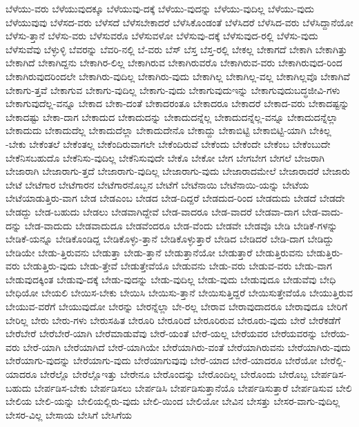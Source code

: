 {ಬೆಳೆಯು-ವರು
ಬೆಳೆಯುವುದಕ್ಕೂ
ಬೆಳೆಯುವು-ದಕ್ಕೆ
ಬೆಳೆಯು-ವುದನ್ನು
ಬೆಳೆಯು-ವುದಿಲ್ಲ
ಬೆಳೆಯು-ವುದು
ಬೆಳೆಯುವುವು
ಬೆಳೆಸದ-ವರು
ಬೆಳೆಸದೆ
ಬೆಳೆಸಬೇಕಾದರೆ
ಬೆಳೆಸಿಕೊಂಡಂತೆ
ಬೆಳೆಸಿದರೆ
ಬೆಳೆಸಿದ-ವರು
ಬೆಳೆಸಿದ್ದಾನೆಯೋ
ಬೆಳೆಸು-ತ್ತಾನೆ
ಬೆಳೆಸು-ವರು
ಬೆಳೆಸುವರೊ
ಬೆಳೆಸುವಳೋ
ಬೆಳೆಸುವು-ದಕ್ಕೆ
ಬೆಳೆಸುವುದ-ರಲ್ಲಿ
ಬೆಳೆಸು-ವುದು
ಬೆಳೆಸುವೆವು
ಬೆಳ್ಳುಳ್ಳಿ
ಬೆವರನ್ನು
ಬೆವರಿ-ನಲ್ಲಿ
ಬೆ-ವರು
ಬೆಸ್
ಬೆಸ್ತ
ಬೆಸ್ತ-ರಲ್ಲಿ
ಬೇಕಲ್ಲ
ಬೇಕಾಗದೆ
ಬೇಕಾಗಿ
ಬೇಕಾಗಿತ್ತು
ಬೇಕಾಗಿದೆ
ಬೇಕಾಗಿದ್ದನು
ಬೇಕಾಗಿರ-ಲಿಲ್ಲ
ಬೇಕಾಗಿರುವ
ಬೇಕಾಗಿರುವರೊ
ಬೇಕಾಗಿರುವ-ವರು
ಬೇಕಾಗಿರುವುದ-ರಿಂದ
ಬೇಕಾಗಿರುವುದರಿಂದಲೇ
ಬೇಕಾಗಿರು-ವುದಿಲ್ಲ
ಬೇಕಾಗಿರು-ವುದು
ಬೇಕಾಗಿಲ್ಲ
ಬೇಕಾಗಿಲ್ಲ-ವಲ್ಲ
ಬೇಕಾಗಿಲ್ಲವೊ
ಬೇಕಾಗಿವೆ
ಬೇಕಾಗು-ತ್ತವೆ
ಬೇಕಾಗುವ
ಬೇಕಾಗು-ವುದಿಲ್ಲ
ಬೇಕಾಗು-ವುದು
ಬೇಕಾಗುವುದುಇನ್ನು
ಬೇಕಾಗುವುದುಬದ್ಧಜೀವಿ-ಗಳು
ಬೇಕಾಗುವುದೆಲ್ಲ-ವನ್ನೂ
ಬೇಕಾದ
ಬೇಕಾ-ದಂತೆ
ಬೇಕಾದರಂತೂ
ಬೇಕಾದರೂ
ಬೇಕಾದರೆ
ಬೇಕಾದ-ವರು
ಬೇಕಾದಷ್ಟನ್ನು
ಬೇಕಾದಷ್ಟು
ಬೇಕಾ-ದಾಗ
ಬೇಕಾದುದ
ಬೇಕಾದುದನ್ನು
ಬೇಕಾದುದನ್ನೆಲ್ಲ
ಬೇಕಾದುದನ್ನೆಲ್ಲ-ವನ್ನೂ
ಬೇಕಾದುದನ್ನೆಲ್ಲಾ
ಬೇಕಾದುದು
ಬೇಕಾದುದೆಲ್ಲ
ಬೇಕಾದುದೆಲ್ಲಾ
ಬೇಕಾದುದೇನೊ
ಬೇಕಾದ್ದು
ಬೇಕಾಬಿಟ್ಟಿ
ಬೇಕಾಬಿಟ್ಟಿ-ಯಾಗಿ
ಬೇಕಿಲ್ಲ
-ಬೇಕು
ಬೇಕೆಂತಲೆ
ಬೇಕೆಂತಲ್ಲ
ಬೇಕೆಂದಿರುವಾಗಲೇ
ಬೇಕೆಂದಿರುವೆ
ಬೇಕೆಂದು
ಬೇಕೆಂದೇ
ಬೇಕೆಂಬ
ಬೇಕೆಂಬುದೇ
ಬೇಕೆನಿಸಬಹುದೊ
ಬೇಕೆನಿಸು-ವುದಿಲ್ಲ
ಬೇಕೆನಿಸುವುದೇ
ಬೇಕೊ
ಬೇಕೋ
ಬೇಗ
ಬೇಗಬೇಗ
ಬೇಗಲೆ
ಬೇಜರಾಗಿ
ಬೇಜಾರಾಗಿ
ಬೇಜಾರಾಗು-ತ್ತದೆ
ಬೇಜಾರಾಗು-ವುದಿಲ್ಲ
ಬೇಜಾರಾಗು-ವುದು
ಬೇಜಾರಾದಮೇಲೆ
ಬೇಜಾರಾದರೆ
ಬೇಜಾರು
ಬೇಟೆ
ಬೇಟೆಗಾರ
ಬೇಟೆಗಾರನ
ಬೇಟೆಗಾರನೊಬ್ಬನ
ಬೇಟೆಗೆ
ಬೇಟೆನಾಯಿ
ಬೇಟೆನಾಯಿ-ಯನ್ನು
ಬೇಟೆಯ
ಬೇಟೆಯಾಡುತ್ತಿರು-ವಾಗ
ಬೇಡ
ಬೇಡಎಂಬ
ಬೇಡದ
ಬೇಡ-ದಿದ್ದರೆ
ಬೇಡದುದ-ರಿಂದ
ಬೇಡದುದು
ಬೇಡದೆ
ಬೇಡದೇ
ಬೇಡದ್ದು
ಬೇಡ-ಬಹುದು
ಬೇಡಲು
ಬೇಡವಾಗಿದ್ದೇವೆ
ಬೇಡ-ವಾದರೂ
ಬೇಡ-ವಾದರೆ
ಬೇಡವಾ-ದಾಗ
ಬೇಡ-ವಾದು-ದನ್ನು
ಬೇಡ-ವಾದುದು
ಬೇಡವಾದುದೂ
ಬೇಡವೆಂದರೂ
ಬೇಡ-ವೆಂದು
ಬೇಡವೇ
ಬೇಡವೊ
ಬೇಡಿ
ಬೇಡಿಕೆ-ಗಳನ್ನು
ಬೇಡಿಕೆ-ಯನ್ನೂ
ಬೇಡಿಕೊಂಡಿದ್ದ
ಬೇಡಿಕೊಳ್ಳು-ತ್ತಾನೆ
ಬೇಡಿಕೊಳ್ಳುತ್ತಾರೆ
ಬೇಡಿದ
ಬೇಡಿದರೆ
ಬೇಡಿ-ದಾಗ
ಬೇಡಿದ್ದು
ಬೇಡಿಯೇ
ಬೇಡು-ತ್ತಿರುವನು
ಬೇಡುತ್ತಾ
ಬೇಡು-ತ್ತಾನೆ
ಬೇಡುತ್ತಾನೆಯೋ
ಬೇಡುತ್ತಾರೆ
ಬೇಡುತ್ತಿರುವನು
ಬೇಡುತ್ತಿರು-ವರು
ಬೇಡುತ್ತಿರು-ವುದು
ಬೇಡು-ತ್ತೇವೆ
ಬೇಡುತ್ತೇವೆಯೊ
ಬೇಡುವನು
ಬೇಡು-ವರು
ಬೇಡುವ-ವರು
ಬೇಡು-ವಾಗ
ಬೇಡುವುದಕ್ಕಿಂತ
ಬೇಡುವು-ದಕ್ಕೆ
ಬೇಡು-ವುದನ್ನು
ಬೇಡು-ವುದಿಲ್ಲ
ಬೇಡು-ವುದು
ಬೇಡುವುದೂ
ಬೇಡುವೆವು
ಬೇಧಿ
ಬೇಧಿಯೋ
ಬೇಯಲಿ
ಬೇಯಿಸ-ಬೇಕು
ಬೇಯಿಸಿ
ಬೇಯಿಸು-ತ್ತಾನೆ
ಬೇಯಿಸುತ್ತಿದ್ದರೆ
ಬೇಯಿಸುತ್ತೇವೆಯೊ
ಬೇಯುತ್ತಿರುವ
ಬೇಯುವ-ವರೆಗೆ
ಬೇಯುವುದೋ
ಬೇರನ್ನು
ಬೇರನ್ನೆಲ್ಲಾ
ಬೇ-ರಲ್ಲ
ಬೇರಾವ
ಬೇರಾವುದಾದರೂ
ಬೇರಾವುದೂ
ಬೇರಿಗೆ
ಬೇರಿಲ್ಲ
ಬೇರು
ಬೇರು-ಗಳು
ಬೇರುಸಹಿತ
ಬೇರೂರಿ
ಬೇರೂರಿದೆ
ಬೇರೂರಿರುವ
ಬೇರೂರು-ವುದು
ಬೇರೆ
ಬೇರೆಕಡೆಗೆ
ಬೇರೆಬೇರೆ
ಬೇರೆಬೇರೆ-ಯಾಗಿ
ಬೇರೆಮಾಡುವೆವು
ಬೇರೆ-ಯಂತೆ
ಬೇರೆ-ಯಲ್ಲ
ಬೇರೆಯವರ
ಬೇರೆಯವರನ್ನು
ಬೇರೆಯ-ವರು
ಬೇರೆ-ಯಾಗಿ
ಬೇರೆಯಾಗಿದೆ
ಬೇರೆ-ಯಾಗಿಯೇ
ಬೇರೆಯಾಗಿರು-ವಂತೆ
ಬೇರೆಯಾಗಿರುವನು
ಬೇರೆಯಾಗಿರು-ವುದು
ಬೇರೆಯಾಗು-ವುದನ್ನು
ಬೇರೆಯಾಗು-ವುದು
ಬೇರೆಯಾಗುವುವು
ಬೇರೆ-ಯಾದ
ಬೇರೆ-ಯಾದರೂ
ಬೇರೆಯೋ
ಬೇರೆಲ್ಲಿ-ಯಾದರೂ
ಬೇರೆಲ್ಲೊ
ಬೇರೆಲ್ಲೊಇತ್ತು
ಬೇರೇನೂ
ಬೇರೊಂದನ್ನು
ಬೇರೊಂದಿಲ್ಲ
ಬೇರೊಂದು
ಬೇರೊಬ್ಬ
ಬೇರ್ಪಡಿಸ-ಬಹುದು
ಬೇರ್ಪಡಿಸ-ಬೇಕು
ಬೇರ್ಪಡಿಸಲು
ಬೇರ್ಪಡಿಸಿ
ಬೇರ್ಪಡಿಸುತ್ತಾನೆಯೊ
ಬೇರ್ಪಡಿಸುತ್ತಾರೆ
ಬೇರ್ಪಡಿಸುವ
ಬೇಲಿ
ಬೇಲಿಯ
ಬೇಲಿ-ಯನ್ನು
ಬೇಲಿಯಲ್ಲಿರು-ವುದು
ಬೇಲಿ-ಯಿಂದ
ಬೇಲಿಯೋ
ಬೇವಿನ
ಬೇಸತ್ತು
ಬೇಸರ-ವಾಗು-ವುದಿಲ್ಲ
ಬೇಸರ-ವಿಲ್ಲ
ಬೇಸಾಯ
ಬೇಸಿಗೆ
ಬೇಸಿಗೆಯ
}
